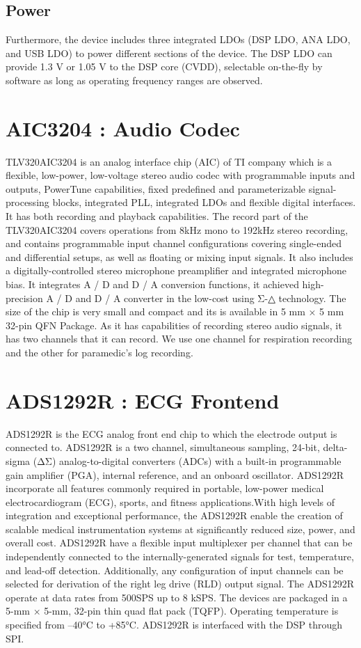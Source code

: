 \subsection{Power} Furthermore, the device includes three integrated LDOs (DSP LDO, ANA LDO, and USB LDO) to power different sections of the device. The DSP LDO can provide 1.3 V or 1.05 V to the DSP core (CVDD), 
selectable on-the-fly by software as long as operating frequency ranges are observed. 


\section{AIC3204 : Audio Codec}
TLV320AIC3204 is an analog interface chip (AIC) of TI company which is a flexible, low-power, low-voltage stereo audio codec with programmable inputs and outputs, PowerTune capabilities, fixed predefined and parameterizable signal-processing blocks, integrated PLL, integrated LDOs and flexible digital interfaces.  It has both recording and playback capabilities. The record part of the TLV320AIC3204 covers operations from 8kHz mono to 192kHz stereo recording, and contains programmable input channel configurations covering single-ended and differential setups, as well as floating or mixing input signals. It also includes a digitally-controlled stereo microphone preamplifier and integrated microphone bias. It integrates A / D and D / A conversion functions, it achieved high-precision A / D and D / A converter in the low-cost using Σ-△ technology. The size of the chip is very small and compact and its is available in  5 mm × 5 mm 32-pin QFN Package. 
As it has capabilities of recording stereo audio signals, it has two channels that it can record. We use one channel for respiration recording and the other for paramedic's log recording.

\section{ADS1292R : ECG Frontend}
ADS1292R is the ECG analog front end chip to which the electrode output is connected to.
ADS1292R is a two channel, simultaneous sampling, 24-bit, delta-sigma (ΔΣ) analog-to-digital converters (ADCs) with a built-in programmable gain amplifier (PGA), internal reference, and an onboard oscillator.  ADS1292R incorporate all features commonly required in portable, low-power medical electrocardiogram (ECG), sports, and fitness applications.With high levels of integration and exceptional performance, the ADS1292R enable the creation of scalable medical instrumentation systems at significantly reduced size, power, and overall cost. ADS1292R have a flexible input multiplexer per channel that can be independently connected to the internally-generated signals for test, temperature, and lead-off detection. Additionally, any configuration of input channels can be selected for derivation of the right leg drive (RLD) output signal. The ADS1292R operate at data rates from 500SPS up to 8 kSPS. The devices are packaged in a 5-mm × 5-mm, 32-pin thin quad flat pack (TQFP). Operating temperature is specified from –40°C to +85°C. ADS1292R is interfaced with the DSP through SPI.
 
